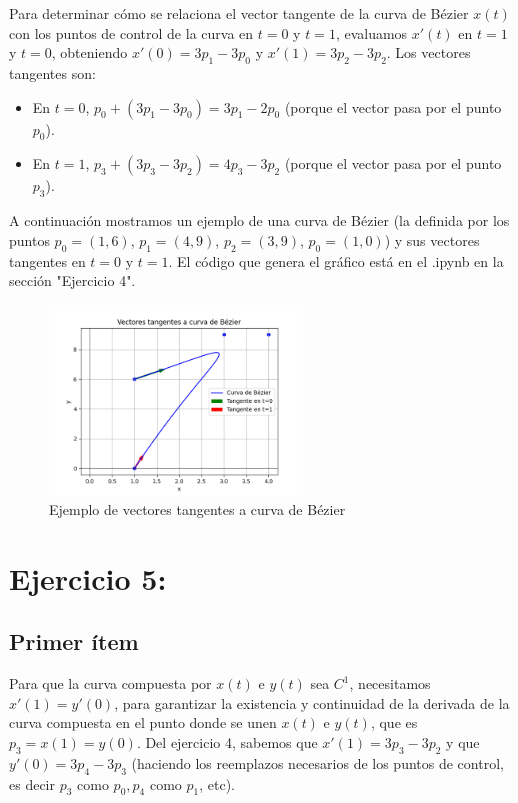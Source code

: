 \documentclass{article}
\begin{document}
Para determinar cómo se relaciona el vector tangente de la curva de Bézier $x(t)$ con los puntos de control de la curva en $t=0$ y $t=1$, evaluamos $x'(t)$ en $t = 1$ y $t = 0$, obteniendo $x'(0) = 3p_1-3p_0$ y $x'(1) = 3p_2-3p_2$. Los vectores tangentes son:
\begin{itemize}
    \item En $t = 0$, $p_0 + (3p_1-3p_0) = 3p_1-2p_0$ (porque el vector pasa por el punto $p_0$).
    \item En $t = 1$, $p_3 +  (3p_3-3p_2) =  4p_3-3p_2$ (porque el vector pasa por el punto $p_3$).
\end{itemize}

A continuación mostramos un ejemplo de una curva de Bézier (la definida por los puntos $p_0 = (1, 6)$, $p_1 = (4, 9)$, $p_2 = (3, 9)$, $p_0 = (1, 0)$) y sus vectores tangentes en $t = 0$ y $t = 1$. El código que genera el gráfico está en el .ipynb en la sección "Ejercicio 4".

\begin{figure}[H]
    \centering
    \includegraphics[width=0.6\textwidth]{imagenes/ej4.png}
    \caption{Ejemplo de vectores tangentes a curva de Bézier}
    \label{fig:ejemplo}
\end{figure}

\section*{Ejercicio 5:}
\subsection*{Primer ítem}
Para que la curva compuesta por $x(t)$ e $y(t)$ sea $C^1$, necesitamos $x'(1) = y'(0)$, para garantizar la existencia y continuidad de la derivada de la curva compuesta en el punto donde se unen $x(t)$ e $y(t)$, que es $p_3 = x(1) = y(0)$. Del ejercicio 4, sabemos que $x'(1) = 3p_3-3p_2$ y que $y'(0) = 3p_4-3p_3$ (haciendo los reemplazos necesarios de los puntos de control, es decir $p_3$ como $p_0, p_4$ como $p_1$, etc).
\end{document}
